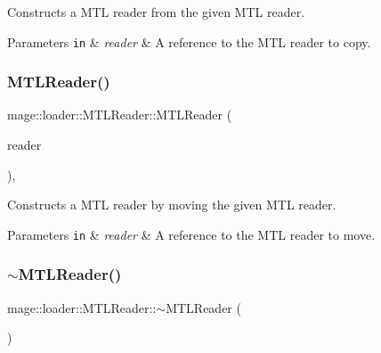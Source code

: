 Constructs a M\+TL reader from the given M\+TL reader.


\begin{DoxyParams}[1]{Parameters}
\mbox{\tt in}  & {\em reader} & A reference to the M\+TL reader to copy. \\
\hline
\end{DoxyParams}
\hypertarget{classmage_1_1loader_1_1_m_t_l_reader_a7278e4533633eb7dcba4b711505a1f24}{}\label{classmage_1_1loader_1_1_m_t_l_reader_a7278e4533633eb7dcba4b711505a1f24} 
\subsubsection{\texorpdfstring{M\+T\+L\+Reader()}{MTLReader()}\hspace{0.1cm}{\footnotesize\ttfamily [3/3]}}
{\footnotesize\ttfamily mage\+::loader\+::\+M\+T\+L\+Reader\+::\+M\+T\+L\+Reader (\begin{DoxyParamCaption}\item[{\hyperlink{classmage_1_1loader_1_1_m_t_l_reader}{M\+T\+L\+Reader} \&\&}]{reader }\end{DoxyParamCaption})\hspace{0.3cm}{\ttfamily [default]}, {\ttfamily [noexcept]}}

Constructs a M\+TL reader by moving the given M\+TL reader.


\begin{DoxyParams}[1]{Parameters}
\mbox{\tt in}  & {\em reader} & A reference to the M\+TL reader to move. \\
\hline
\end{DoxyParams}
\hypertarget{classmage_1_1loader_1_1_m_t_l_reader_a03836eca33fe646ea5d515a5cb2b2eb6}{}\label{classmage_1_1loader_1_1_m_t_l_reader_a03836eca33fe646ea5d515a5cb2b2eb6} 
\subsubsection{\texorpdfstring{$\sim$\+M\+T\+L\+Reader()}{~MTLReader()}}
{\footnotesize\ttfamily mage\+::loader\+::\+M\+T\+L\+Reader\+::$\sim$\+M\+T\+L\+Reader (\begin{DoxyParamCaption}{ }\end{DoxyParamCaption})\hspace{0.3cm}{\ttfamily [default]}}

